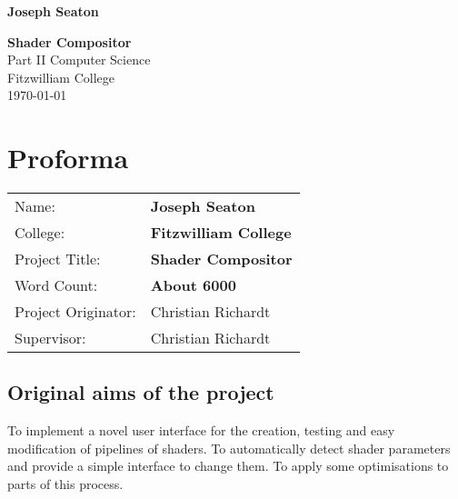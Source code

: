 \documentclass[12pt,twoside,notitlepage]{report}
\begin{document}


\newcommand{\name}{Joseph Seaton}
\newcommand{\college}{Fitzwilliam College}
\newcommand{\ptitle}{Shader Compositor}



\pagestyle{empty}

\hfill{\LARGE \bf \name}

\vspace*{60mm}
\begin{center}
\Huge
{\bf \ptitle} \\
\vspace*{5mm}
Part II Computer Science \\
\vspace*{5mm}
\college \\
\vspace*{5mm}
\today  %
\end{center}

\cleardoublepage


\setcounter{page}{1}
\pagestyle{plain}

\chapter*{Proforma}

{\large
\begin{tabular}{ll}
Name:               & \bf \name    \\
College:            & \bf \college \\
Project Title:      & \bf \ptitle  \\
Word Count:         & \bf About 6000 \\
Project Originator: & Christian Richardt                    \\
Supervisor:         & Christian Richardt                    \\ 
\end{tabular}
}


\section*{Original aims of the project}
To implement a novel user interface for the creation, testing and easy modification of pipelines of shaders. To automatically detect shader parameters and provide a simple interface to change them. To apply some optimisations to parts of this process.
\end{document}
